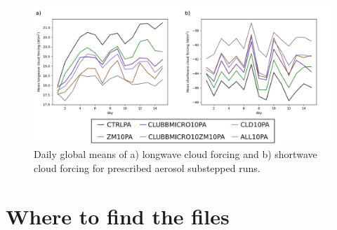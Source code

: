 \documentclass [11pt, proquest] {uwthesis}[2020/02/24]
\begin{document}
\begin{figure}
    \centering
    \includegraphics[width=5.5in]{Figure15.png}
    \caption{Daily global means of a) longwave cloud forcing and b) shortwave cloud forcing for prescribed aerosol substepped runs.}
    \label{fig:cld-frc-pa}
\end{figure}

\printendnotes

%
%
%
\printbibliography[heading=bibintoc]
%
%
\appendix
\raggedbottom\sloppy
 
 
\chapter{Where to find the files}


\end{document}
